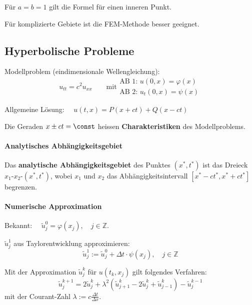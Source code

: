 			\begin{tightitemize}
				\item Für $a=b=1$ gilt die Formel für einen inneren Punkt.\\
				\item Für komplizierte Gebiete ist die FEM-Methode besser geeignet.
			\end{tightitemize}

	\subsection{Hyperbolische Probleme} Modellproblem (eindimensionale Wellengleichung):
		\[
			u_{tt}=c^2u_{xx} \qquad \text{mit} \begin{array}{l}
				\text{AB 1: } u(0,x)=\varphi(x) \\
				\text{AB 2: } u_t(0,x)=\psi(x)
			\end{array}
		\]

		Allgemeine Lösung: $\quad u(t,x)=P(x+ct)+Q(x-ct) $

		Die Geraden $x \pm ct = \const$ heissen \textbf{Charakteristiken} des Modellproblems.

		\paragraph{Analytisches Abhängigkeitsgebiet}
			Das \textbf{analytische Abhängigkeitsgebiet} des Punktes $(x^*,t^*)$ ist das Dreieck $x_1$-$x_2$-$(x^*,t^*)$, wobei $x_1$ und $x_2$ das Abhängigkeitsintervall $[x^*-ct^*, x^*+ct^*]$ begrenzen.

		\paragraph{Numerische Approximation}
			\begin{tightenumerate}
				\item Bekannt: $\quad \tilde u_j^0=\varphi(x_j),\quad j \in \mathbb{Z}$.
				\item $\tilde u_j^1$ aus Taylorentwicklung approximieren:
					\[
						\tilde u_j^1 := \tilde u_j^0 + \Delta t \cdot \psi(x_j),\quad j \in \mathbb{Z}
					\]
				\item Mit der Approximation $\tilde u_j^k$ für $u(t_k,x_j)$ gilt folgendes Verfahren:
					\[
						\tilde u_j^{k+1} = 2\tilde u_j^k + \lambda^2 \left( \tilde u_{j+1}^k -2\tilde u_j^k + \tilde u_{j-1}^k\right) - \tilde u_j^{k-1}
					\]
					mit der Courant-Zahl $ \lambda := c \frac{\Delta t}{\Delta x}$.
			\end{tightenumerate}

